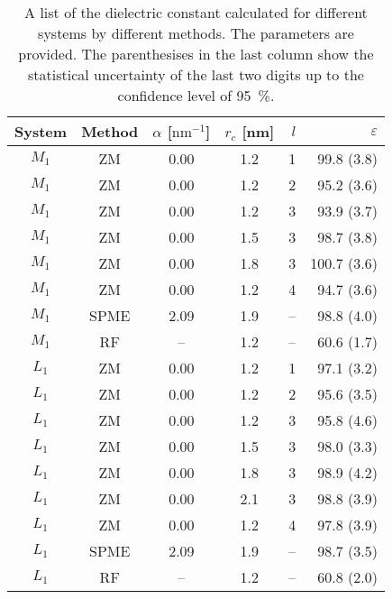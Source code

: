 \documentclass[aip,jcp,a4paper,preprint,unsortedaddress,onecolumn,fleqn]{revtex4-1}
\newcommand{\eps}{\varepsilon}
\newcommand{\systemmb}{M_1}
\newcommand{\systemlb}{L_1}
\begin{document}
\begin{table}
  \centering
  \caption{A list of the dielectric constant calculated for different systems by different methods.
    The parameters are provided. The parenthesises in the last column show the statistical uncertainty
    of the last two digits up to the confidence level of 95~\%.}
  \begin{tabular*}{0.5\textwidth}{@{\extracolsep{\fill}}cccc rr}\hline\hline
    System & Method      &       $\alpha$ [$\textrm{nm}^{-1}$] & $r_c$ [nm] &    $l$     &       $\eps$ \\\hline
    $\systemmb$  &       ZM          &       0.00    &       1.2     &       1       &       99.8 (3.8)\\ 
    $\systemmb$  &       ZM          &       0.00    &       1.2     &       2       &       95.2 (3.6)\\ 
    $\systemmb$  &       ZM          &       0.00    &       1.2     &       3       &       93.9 (3.7)\\ 
    $\systemmb$  &       ZM          &       0.00    &       1.5     &       3       &       98.7 (3.8)\\ 
    $\systemmb$  &       ZM          &       0.00    &       1.8     &       3       &      100.7 (3.6)\\ 
    $\systemmb$  &       ZM          &       0.00    &       1.2     &       4       &       94.7 (3.6)\\
    $\systemmb$   & SPME          & 2.09  & 1.9   &       --      &       98.8 (4.0) \\
    $\systemmb$  & RF             & --  & 1.2 & -- & 60.6   (1.7) \\
    $\systemlb$  &       ZM          &       0.00    &       1.2     &       1       &       97.1 (3.2)\\ 
    $\systemlb$  &       ZM          &       0.00    &       1.2     &       2       &       95.6 (3.5)\\ 
    $\systemlb$  &       ZM          &       0.00    &       1.2     &       3       &       95.8 (4.6)\\ 
    $\systemlb$  &       ZM          &       0.00    &       1.5     &       3       &       98.0 (3.3)\\ 
    $\systemlb$  &       ZM          &       0.00    &       1.8     &       3       &       98.9 (4.2)\\ 
    $\systemlb$  &       ZM          &       0.00    &       2.1     &       3       &       98.8 (3.9)\\ 
    $\systemlb$  &       ZM          &       0.00    &       1.2     &       4       &       97.8 (3.9)\\
   $\systemlb$   & SPME          & 2.09  & 1.9   &       --      &       98.7 (3.5) \\
    $\systemlb$  & RF             & --  & 1.2 & -- & 60.8   (2.0) \\
    \hline\hline
  \end{tabular*}
  \label{tab:tmp2}
\end{table}
\end{document}
